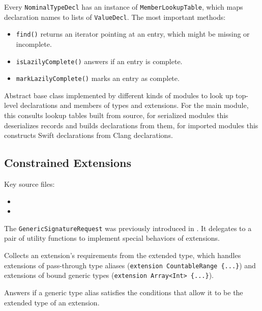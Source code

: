\documentclass[../generics]{subfiles}
\begin{document}
Every \texttt{NominalTypeDecl} has an instance of \texttt{MemberLookupTable}, which maps declaration names to lists of \texttt{ValueDecl}. The most important methods:
\begin{itemize}
\item \texttt{find()} returns an iterator pointing at an entry, which might be missing or incomplete.
\item \texttt{isLazilyComplete()} answers if an entry is complete.
\item \texttt{markLazilyComplete()} marks an entry as complete.
\end{itemize}

Abstract base class implemented by different kinds of modules to look up top-level declarations and members of types and extensions. For the main module, this consults lookup tables built from source, for serialized modules this deserializes records and builds declarations from them, for imported modules this constructs Swift declarations from Clang declarations.

\subsection*{Constrained Extensions}

Key source files:
\begin{itemize}
\item {}
\item {}
\end{itemize}
The \texttt{GenericSignatureRequest} was previously introduced in . It delegates to a pair of utility functions to implement special behaviors of extensions.

Collects an extension's requirements from the extended type, which handles extensions of pass-through type aliases (\verb|extension CountableRange {...}|) and extensions of bound generic types (\verb|extension Array<Int> {...}|).

Answers if a generic type alias satisfies the conditions that allow it to be the extended type of an extension.
\end{document}
